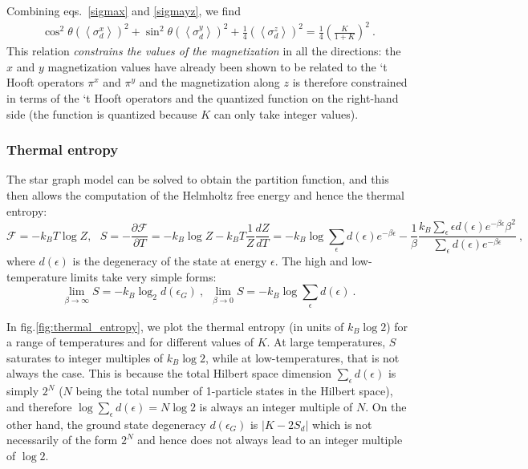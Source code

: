 \documentclass[reprint,onecolumn,prb,superscriptaddress]{revtex4-2}
\begin{document}
Combining eqs.~\ref{sigmax} and \ref{sigmayz}, we find
\begin{equation}\begin{aligned}
	\cos^2\theta\left(\left<\sigma^x_d\right>\right)^2 + \sin^2\theta\left(\left<\sigma^y_d\right>\right)^2 + \frac{1}{4}\left(\left<\sigma^z_d\right>\right)^2 = \frac{1}{4}\left(\frac{K}{1+K}\right)^2~.
\end{aligned}\end{equation}
This relation \textit{constrains the values of the magnetization} in all the directions: the \(x\) and \(y\) magnetization values have already been shown to be related to the `t Hooft operators \(\pi^x\) and \(\pi^y\) and the magnetization along \(z\) is therefore constrained in terms of the `t Hooft operators and the quantized function on the right-hand side (the function is quantized because \(K\) can only take integer values).

\subsubsection{Thermal entropy}
The star graph model can be solved to obtain the partition function, and this then allows the computation of the Helmholtz free energy and hence the thermal entropy:
\begin{equation}
\mathcal{F}= -k_B T\log Z, ~ ~ ~ S = -\frac{\partial \mathcal{F}}{\partial T} = -k_B \log Z -k_B T \frac{1}{Z} \frac{dZ}{dT} = -k_B \log \sum_{\epsilon} d(\epsilon) e^{-\beta \epsilon}  -\frac{1}{\beta} \frac{k_B\sum_\epsilon \epsilon d(\epsilon) e^{-\beta \epsilon} \beta^2   }{\sum_\epsilon  d(\epsilon)e^{-\beta \epsilon}}~,
\end{equation}
where \(d(\epsilon)\) is the degeneracy of the state at energy \(\epsilon\). The high and low-temperature limits take very simple forms:
\begin{equation}
\lim_{\beta\rightarrow \infty} S = -k_B \log_2 d(\epsilon_{G})~,~~\lim_{\beta\rightarrow 0} S = -k_B \log \sum_\epsilon d(\epsilon)~.
\end{equation}

In fig.\ref{fig:thermal_entropy}, we plot the thermal entropy (in units of $k_B \log 2$) for a range of temperatures and for different values of \(K\). At large temperatures, \(S\) saturates to integer multiples of \(k_B \log 2\), while at low-temperatures, that is not always the case. This is because the total Hilbert space dimension \(\sum _\epsilon d(\epsilon)\) is simply \(2^N\) (\(N\) being the total number of 1-particle states in the Hilbert space), and therefore \(\log \sum _\epsilon d(\epsilon) = N \log 2\) is always an integer multiple of \(N\). On the other hand, the ground state degeneracy \(d(\epsilon_G)\) is \(|K - 2 S_d|\) which is not necessarily of the form \(2^N\) and hence does not always lead to an integer multiple of \(\log 2\).
\end{document}
